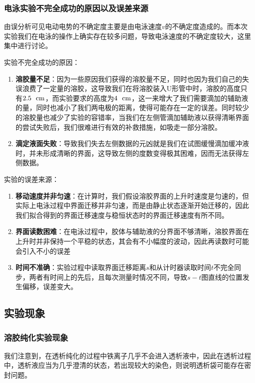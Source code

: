 \documentclass[12pt]{article}
\begin{document}
		\subsubsection{电泳实验不完全成功的原因以及误差来源}
		由误分析可见电动电势的不确定度主要是由电泳速度$v$的不确定度造成的。而本次实验我们在电泳的操作上确实存在较多问题，导致电泳速度的不确定度较大，这里集中进行讨论。\par
		实验不完全成功的原因：\par
		\begin{enumerate}
			\item \textbf{溶胶量不足}：因为一些原因我们获得的溶胶量不足，同时也因为我们自己的失误浪费了一定量的溶胶，这导致我们在将溶胶装入U形管中时，溶胶的高度只有$2.5\ \ \rm cm$，而实验要求的高度为$4\ \ \rm cm$，这一来增大了我们需要滴加的辅助液的量，同时也减小了我们两电极的距离，使得可能存在一定的误差。同时较少的溶胶量也减少了实验的容错率，当我们在左侧管滴加辅助液以获得清晰界面的尝试失败后，我们很难进行有效的补救措施，如吸走一部分溶胶。\par
			\item \textbf{滴定液面失败}：导致我们失去左侧数据的元凶就是我们在试图缓慢滴加缓冲液时，并未形成清晰的界面，这导致左侧的度数变得极其困难，因而无法获得左侧数据。
		\end{enumerate}
		实验的误差来源：\par
		\begin{enumerate}
			\item \textbf{移动速度并非匀速}：在计算时，我们假设溶胶界面的上升时速度是匀速的，但实际上电泳过程中界面迁移并非匀速，而是由静止状态逐渐开始迁移的，因此我们拟合得到的界面迁移速度与稳恒状态时的界面迁移速度有所不同。\par
			\item \textbf{界面读数困难}：在电泳过程中，胶体与辅助液的分界面不够清晰，溶胶界面在上升时并非保持一个平稳的状态，其会有不小幅度的波动，因此再读数时可能会引入不小的误差\par
			\item \textbf{时间不准确}：实验过程中读取界面迁移距离$s$和从计时器读取时间$t$不完全同步，两者有时间上的先后，且每次测量时情况不同，导致$s-t$图直线的位置发生偏移，误差变大。\par
		\end{enumerate}
		\subsection{实验现象}
		\subsubsection{溶胶纯化实验现象}
		我们注意到，在透析纯化的过程中铁离子几乎不会进入透析液中，因此在透析过程中，透析液应当为几乎澄清的状态，若出现较大的染色，则说明透析袋可能存在密封问题。\par
\end{document}
